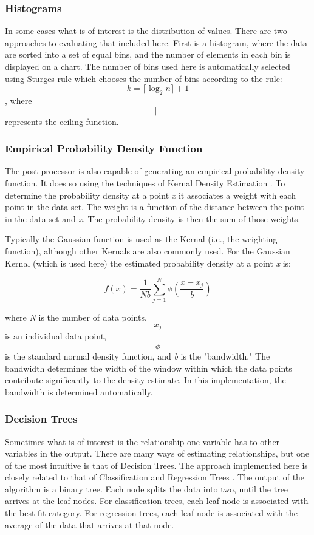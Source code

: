 \documentclass[12pt,twoside]{book}
\begin{document}
\subsubsection{Histograms}

In some cases what is of interest is the distribution of values. There are two approaches to evaluating that  included here. First is a histogram, where the data are sorted into a set of equal bins, and the number of elements in each bin is displayed on a chart. The number of bins used here is automatically selected using Sturges rule \cite{Sturges_1926} which chooses the number of bins according to the rule: \[k = \lceil \log_2 n \rceil + 1\], where  \[ \lceil \rceil\] represents the ceiling function.

\subsubsection{Empirical Probability Density Function}

The post-processor is also capable of generating an empirical probability density function. It does so using the techniques of Kernal Density Estimation \cite{Haste_2009}. To determine the probability density at a point \textit{x} it associates a weight with each point in the data set. The weight is a function of the distance between the point in the data set and \textit{x}. The probability density is then the sum of those weights.

Typically the Gaussian function is used as the Kernal (i.e., the weighting function), although other Kernals are also commonly used. For the Gaussian Kernal (which is used here) the estimated probability density at a point \textit{x} is:

\[f(x) = \frac{1}{Nb}\sum_{j=1}^{N} \phi\left(\frac{x - x_j}{b} \right) \]

where \textit{N} is the number of data points, \[x_j\] is an individual data point, \[\phi\] is the standard normal density function, and \textit{b} is the "bandwidth." The bandwidth determines the width of the window within which the data points contribute significantly to the density estimate. In this implementation, the bandwidth is determined automatically.

\subsubsection{Decision Trees}

Sometimes what is of interest is the relationship one variable has to other variables in the output. There are many ways of estimating relationships, but one of the most intuitive is that of Decision Trees. The approach implemented here is closely related to that of Classification and Regression Trees \cite{Haste_2009}. The output of the algorithm is a binary tree. Each node splits the data into two, until the tree arrives at the leaf nodes. For classification trees, each leaf node is associated with the best-fit category. For regression trees, each leaf node is associated with the average of the data that arrives at that node.
\end{document}
